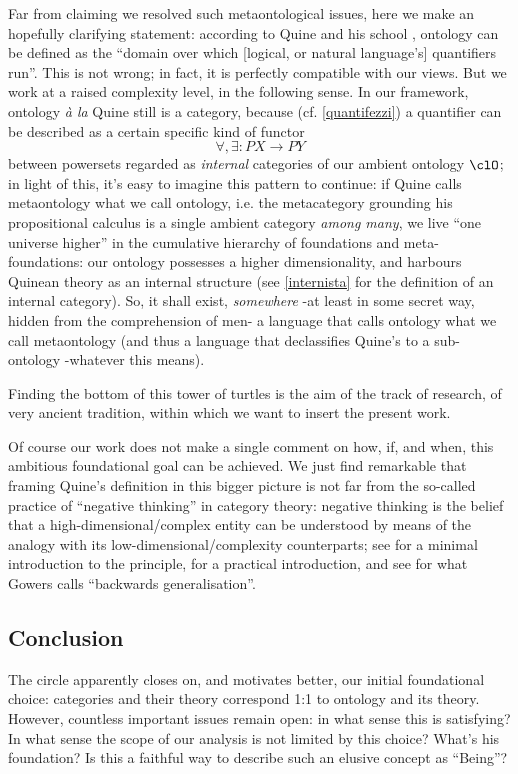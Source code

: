 Far from claiming we resolved such metaontological issues, here we make an hopefully clarifying statement: according to Quine and his school \cite{}, ontology can be defined as the ``domain over which [logical, or natural language's] quantifiers run''. This is not wrong; in fact, it is perfectly compatible with our views. But we work at a raised complexity level, in the following sense. In our framework, ontology \emph{à la} Quine still is a category, because (cf. \autoref{quantifezzi}) a quantifier can be described as a certain specific kind of functor
\[\forall,\exists : PX \to PY\]
between powersets regarded as \emph{internal} categories of our ambient ontology $\clO$; in light of this, it's easy to imagine this pattern to continue: if Quine calls metaontology what we call ontology, i.e. the metacategory grounding his propositional calculus is a single ambient category \emph{among many}, we live ``one universe higher'' in the cumulative hierarchy of foundations and meta-foundations: our ontology possesses a higher dimensionality, and harbours Quinean theory as an internal structure (see \autoref{internista} for the definition of an internal category). So, it shall exist, \emph{somewhere} -at least in some secret way, hidden from the comprehension of men- a language that calls ontology what we call metaontology (and thus a language that declassifies Quine's to a sub-ontology -whatever this means).

Finding the bottom of this tower of turtles is the aim of the track of research, of very ancient tradition, within which we want to insert the present work.

Of course our work does not make a single comment on how, if, and when, this ambitious foundational goal can be achieved. We just find remarkable that framing Quine's definition in this bigger picture is not far from the so-called practice of ``negative thinking'' in category theory: negative thinking is the belief that a high-dimensional/complex entity can be understood by means of the analogy with its low-dimensional/complexity counterparts; see \cite{nlab:category-order,nlab:neg-think} for a minimal introduction to the principle, \cite{baez2010lectures} for a practical introduction, and see \cite{gowers2007} for what Gowers calls ``backwards generalisation''.
\subsection{Conclusion}
The circle apparently closes on, and motivates better, our initial foundational choice: categories and their theory correspond 1:1 to ontology and its theory. However, countless important issues remain open: in what sense this is satisfying? In what sense the scope of our analysis is not limited by this choice? What's his foundation? Is this a faithful way to describe such an elusive concept as ``Being''?

